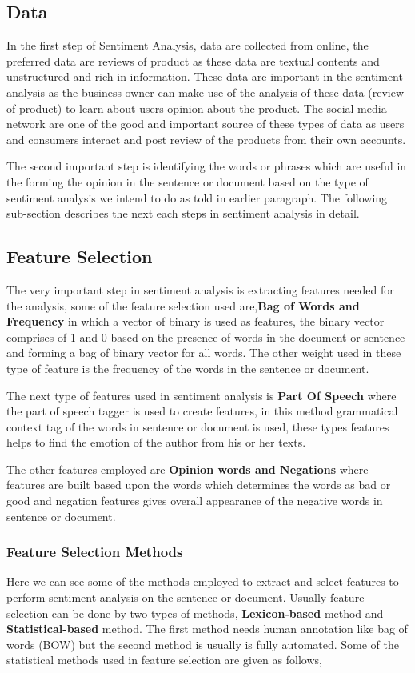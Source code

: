 \documentclass[sigconf]{acmart}
\begin{document}
\subsection{Data}
In the first step of Sentiment Analysis, data are collected from online, the preferred data are reviews of product as these data are textual contents and unstructured and rich in information. These data are important in the sentiment analysis as the business owner can make use of the analysis of these data (review of product) to learn about users opinion about the product. The social media network are one of the good and important source of these types of data as users and consumers interact and post review of the products from their own accounts. 

The second important step is identifying the words or phrases which are useful in the forming the opinion in the sentence or document based on the type of sentiment analysis we intend to do as told in earlier paragraph. The following sub-section describes the next each steps in sentiment analysis in detail.

\subsection{Feature Selection}
The very important step in sentiment analysis is extracting features needed for the analysis, some of the feature selection used are,\textbf{Bag of Words and Frequency} in which a vector of binary is used as features, the binary vector comprises of 1 and 0 based on the presence of words in the document or sentence and forming a bag of binary vector for all words. The other weight used in these type of feature is the frequency of the words in the sentence or document. 

The next type of features used in sentiment analysis is \textbf{Part Of Speech} where the part of speech tagger is used to create features, in this method grammatical context tag of the words in sentence or document is used, these types features helps to find the emotion of the author from his or her texts.

The other features employed are \textbf{Opinion words and Negations} where features are built based upon the words which determines the words as bad or good and negation features gives overall appearance of the negative words in sentence or document.
\subsubsection{Feature Selection Methods} 
Here we can see some of the methods employed to extract and select features to perform sentiment analysis on the sentence or document. Usually feature selection can be done by two types of methods, \textbf{Lexicon-based} \cite{lexi} method and \textbf{Statistical-based} \cite{statis} method. The first method needs human annotation like bag of words (BOW) \cite{lexi} but the second method is usually is fully automated. Some of the statistical methods used in feature selection are given as follows,
\end{document}
